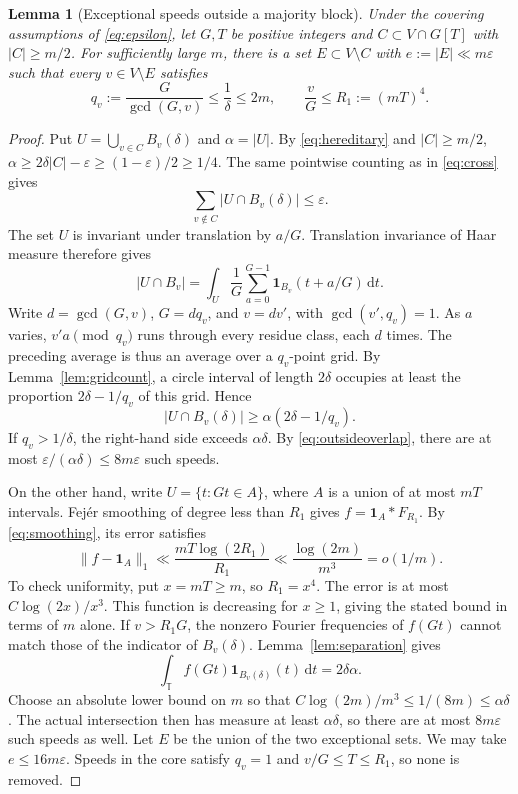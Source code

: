 \documentclass[12pt,leqno]{article}
\numberwithin{equation}{section}
\newtheorem{lemma}[theorem]{Lemma}
\theoremstyle{remark}
\newcommand{\LRtorus}{\mathbb T}
\newcommand{\LRindicator}{\mathbf 1}
\newcommand{\LRdifferential}{\,\mathrm d}
\begin{document}
\begin{lemma}[Exceptional speeds outside a majority block]\label{lem:exceptions}
Under the covering assumptions of \eqref{eq:epsilon}, let $G,T$ be positive integers and $C\subset V\cap G[T]$ with $|C|\ge m/2$. For sufficiently large $m$, there is a set $E\subset V\setminus C$ with $e:=|E|\ll m\varepsilon$ such that every $v\in V\setminus E$ satisfies
\begin{equation}\label{eq:nonexceptions}
q_v:=\frac G{\gcd(G,v)}\le\frac1\delta\le2m,\qquad
\frac vG\le R_1:=(mT)^4.
\end{equation}
\end{lemma}
\begin{proof}
Put $U=\bigcup_{v\in C}B_v(\delta)$ and $\alpha=|U|$. By \eqref{eq:hereditary} and $|C|\ge m/2$,
$\alpha\ge2\delta|C|-\varepsilon\ge(1-\varepsilon)/2\ge1/4$. The same pointwise counting as in \eqref{eq:cross} gives
\begin{equation}\label{eq:outsideoverlap}
\sum_{v\notin C}|U\cap B_v(\delta)|\le\varepsilon.
\end{equation}
The set $U$ is invariant under translation by $a/G$. Translation invariance of Haar measure therefore gives
\[
|U\cap B_v|=\int_U\frac1G\sum_{a=0}^{G-1}
\LRindicator_{B_v}(t+a/G)\LRdifferential t.
\]
Write $d=\gcd(G,v)$, $G=dq_v$, and $v=dv'$, with $\gcd(v',q_v)=1$. As $a$ varies, $v'a\pmod{q_v}$ runs through every residue class, each $d$ times. The preceding average is thus an average over a $q_v$-point grid. By Lemma~\ref{lem:gridcount}, a circle interval of length $2\delta$ occupies at least the proportion $2\delta-1/q_v$ of this grid. Hence
\begin{equation}\label{eq:grid}
|U\cap B_v(\delta)|\ge\alpha(2\delta-1/q_v).
\end{equation}
If $q_v>1/\delta$, the right-hand side exceeds $\alpha\delta$. By \eqref{eq:outsideoverlap}, there are at most $\varepsilon/(\alpha\delta)\le8m\varepsilon$ such speeds.

On the other hand, write $U=\{t:Gt\in A\}$, where $A$ is a union of at most $mT$ intervals. Fej\'er smoothing of degree less than $R_1$ gives $f=\LRindicator_A*F_{R_1}$. By \eqref{eq:smoothing}, its error satisfies
\[
\|f-\LRindicator_A\|_1\ll \frac{mT\log(2R_1)}{R_1}
\ll\frac{\log(2m)}{m^3}=o(1/m).
\]
To check uniformity, put $x=mT\ge m$, so $R_1=x^4$. The error is at most $C\log(2x)/x^3$. This function is decreasing for $x\ge1$, giving the stated bound in terms of $m$ alone. If $v>R_1G$, the nonzero Fourier frequencies of $f(Gt)$ cannot match those of the indicator of $B_v(\delta)$. Lemma~\ref{lem:separation} gives
\[
\int_\LRtorus f(Gt)\LRindicator_{B_v(\delta)}(t)\LRdifferential t=2\delta\alpha.
\]
Choose an absolute lower bound on $m$ so that $C\log(2m)/m^3\le1/(8m)\le\alpha\delta$. The actual intersection then has measure at least $\alpha\delta$, so there are at most $8m\varepsilon$ such speeds as well. Let $E$ be the union of the two exceptional sets. We may take $e\le16m\varepsilon$. Speeds in the core satisfy $q_v=1$ and $v/G\le T\le R_1$, so none is removed.
\end{proof}
\end{document}
